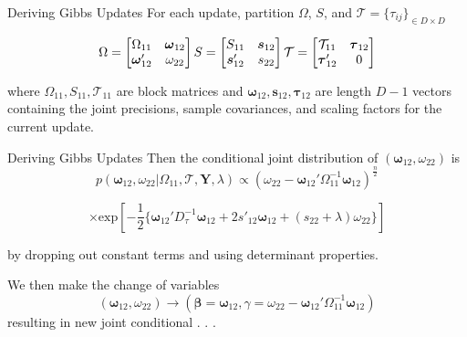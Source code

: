 \documentclass[
  ignorenonframetext,
]{beamer}
\begin{document}
\begin{frame}{Deriving Gibbs Updates}
\label{deriving-gibbs-updates}
For each update, partition \(\Omega\), \(S\), and
\(\mathcal{T} = \{\tau_{ij}\}_{\in D\times D}\)

\[\Omega = \begin{bmatrix}
\Omega_{11} & \boldsymbol{\omega}_{12} \\
\boldsymbol{\omega}_{12}' & \omega_{22} 
\end{bmatrix} \space S = \begin{bmatrix}
S_{11} & \boldsymbol{s}_{12} \\
\boldsymbol{s}_{12}' & s_{22} 
\end{bmatrix} \space \mathcal{T} = \begin{bmatrix}
\mathcal{T}_{11} & \boldsymbol{\tau}_{12} \\
\boldsymbol{\tau}_{12}' & 0 
\end{bmatrix} \space\]

where \(\Omega_{11}, S_{11}, \mathcal{T}_{11}\) are block matrices and
\(\boldsymbol{\omega}_{12}, \boldsymbol{s}_{12}, \boldsymbol{\tau}_{12}\)
are length \(D-1\) vectors containing the joint precisions, sample
covariances, and scaling factors for the current update.
\end{frame}

\begin{frame}{Deriving Gibbs Updates}
\label{deriving-gibbs-updates-1}
Then the conditional joint distribution of
\((\boldsymbol{\omega}_{12},\omega_{22})\) is
\[p(\boldsymbol{\omega}_{12},\omega_{22}|\Omega_{11},\mathcal{T},\textbf{Y},\lambda) \propto (\omega_{22} - \boldsymbol{\omega}_{12}' \Omega_{11}^{-1}\boldsymbol{\omega}_{12})^{\frac{n}{2}}\]

\[\times \textrm{exp}[-\frac{1}{2}\{\boldsymbol{\omega}_{12}'D_{\tau}^{-1}\boldsymbol{\omega}_{12} + 2s'_{12}\boldsymbol{\omega}_{12} + (s_{22}+\lambda)\omega_{22}\}]\]

by dropping out constant terms and using determinant properties.

We then make the change of variables
\[(\boldsymbol{\omega}_{12},\omega_{22}) \to (\boldsymbol{\beta} = \boldsymbol{\omega}_{12}, \gamma = \omega_{22} - \boldsymbol{\omega}_{12}' \Omega_{11}^{-1}\boldsymbol{\omega}_{12})\]
resulting in new joint conditional . . .
\end{frame}
\end{document}
